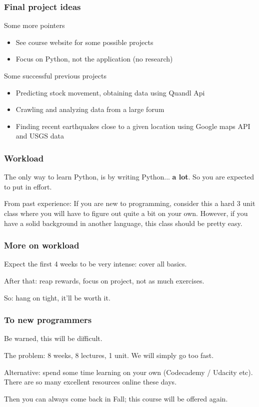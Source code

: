 \begin{frame}\frametitle{Final project ideas}

    Some more pointers

    \begin{itemize}
        \item See course website for some possible projects
        \item Focus on Python, not the application (no research)
    \end{itemize}

    Some successful previous projects

    \begin{itemize}
        \item Predicting stock movement, obtaining data using Quandl Api
        \item Crawling and analyzing data from a large forum
        \item Finding recent earthquakes close to a given location using Google maps API and USGS data
    \end{itemize}


\end{frame}

\begin{frame}\frametitle{Workload}

    The only way to learn Python, is by writing Python... \textbf{a lot}.
    So you are expected to put in effort.

    \vfill

    From past experience: If you are new to programming, consider this a hard 3 unit class
    where you will have to figure out quite a bit on your own.
    However, if you have a solid background in another language, this class should be pretty easy.

\end{frame}

\begin{frame}\frametitle{More on workload}

    Expect the first 4 weeks to be very intense: cover all basics.

    After that: reap rewards, focus on project, not as much exercises.

    \vfill

    So: hang on tight, it'll be worth it.

\end{frame}

\begin{frame}\frametitle{To new programmers}

    Be warned, this will be difficult.

    \vfill

    The problem: 8 weeks, 8 lectures, 1 unit. We will simply go too fast.

    \vfill

    Alternative: spend some time learning on your own (Codecademy / Udacity etc).
    There are so many excellent resources online these days.

    Then you can always come back in Fall; this course will be offered again.

\end{frame}

